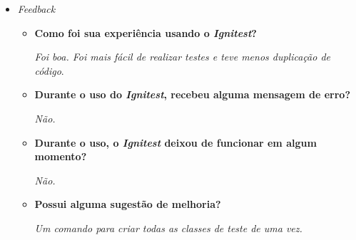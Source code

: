 \begin{itemize}
\begin{itemize}
\begin{enumerate}
                    \end{enumerate}
            \end{itemize}
        
        \item \textit{Feedback}
            \begin{itemize}
                \item \textbf{Como foi sua experiência usando o \textit{Ignitest}?}
            
           \subitem \textit{Foi boa. Foi mais fácil de realizar testes e teve menos duplicação de código}.
          
                \item \textbf{Durante o uso do \textit{Ignitest}, recebeu alguma mensagem de erro?}
                
                    \subitem \textit{Não.}
           
                \item \textbf{Durante o uso, o \textit{Ignitest} deixou de funcionar em algum momento?}
                
                    \subitem \textit{Não.}
           
                \item \textbf{Possui alguma sugestão de melhoria?}
                
                    \subitem \textit{Um comando para criar todas as classes de teste de uma vez.}
            \end{itemize}
    \end{itemize}